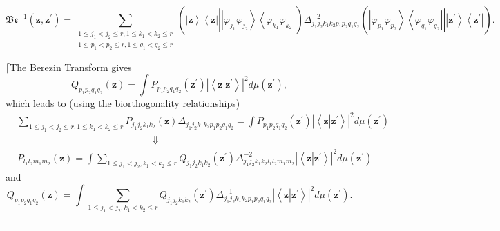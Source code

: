 \documentclass[aps,preprint]{revtex4}%
\begin{document}
\begin{equation}
\mathfrak{Be}^{-1}\left(  \mathbf{z,z}^{\prime}\right)  =\sum_{\substack{1\leq
j_{1}<j_{2}\leq r,1\leq k_{1}<k_{2}\leq r\\1\leq p_{1}<p_{2}\leq r,1\leq
q_{1}<q_{2}\leq r}}\left(  \left\vert \mathbf{z}\right\rangle \left\langle
\mathbf{z}\right\vert \left\vert \overset{}{\left\vert \varphi_{j_{1}}%
\varphi_{j_{2}}\right\rangle \left\langle \varphi_{k_{1}}\varphi_{k_{2}%
}\right\vert }\right.  \right)  \Delta_{j_{1}j_{2}k_{1}k_{2}p_{1}p_{2}%
q_{1}q_{2}}^{-2}\left(  \left.  \overset{}{\left\vert \varphi_{p_{1}}%
\varphi_{p_{2}}\right\rangle \left\langle \varphi_{q_{1}}\varphi_{q_{2}%
}\right\vert }\right\vert \left\vert \mathbf{z}^{\prime}\right\rangle
\left\langle \mathbf{z}^{\prime}\right\vert \right)  .
\end{equation}


$\lceil$The Berezin Transform gives
\begin{equation}
Q_{p_{1}p_{2}q_{1}q_{2}}\left(  \mathbf{z}\right)  =\int P_{p_{1}p_{2}%
q_{1}q_{2}}\left(  \mathbf{z}^{\prime}\right)  \left\vert \left\langle
\mathbf{z}\left\vert \mathbf{z}^{\prime}\right.  \right\rangle \right\vert
^{2}d\mu\left(  \mathbf{z}^{\prime}\right)  ,
\end{equation}
which leads to (using the biorthogonality relationships)
\begin{align}
&  \sum_{1\leq j_{1}<j_{2}\leq r,1\leq k_{1}<k_{2}\leq r}P_{j_{1}j_{2}%
k_{1}k_{2}}\left(  \mathbf{z}\right)  \Delta_{j_{1}j_{2}k_{1}k_{2}p_{1}%
p_{2}q_{1}q_{2}}=\int P_{p_{1}p_{2}q_{1}q_{2}}\left(  \mathbf{z}^{\prime
}\right)  \left\vert \left\langle \mathbf{z}\left\vert \mathbf{z}^{\prime
}\right.  \right\rangle \right\vert ^{2}d\mu\left(  \mathbf{z}^{\prime}\right)
\nonumber\\
&  \qquad\qquad\qquad\qquad\qquad\qquad\qquad\left.  \Downarrow\right.
\nonumber\\
&  P_{l_{1}l_{2}m_{1}m_{2}}\left(  \mathbf{z}\right)  =\int\sum_{1\leq
j_{1}<j_{2},k_{1}<k_{2}\leq r}Q_{j_{1}j_{2}k_{1}k_{2}}\left(  \mathbf{z}%
^{\prime}\right)  \Delta_{j_{1}j_{2}k_{1}k_{2}l_{1}l_{2}m_{1}m_{2}}%
^{-2}\left\vert \left\langle \mathbf{z}\left\vert \mathbf{z}^{\prime}\right.
\right\rangle \right\vert ^{2}d\mu\left(  \mathbf{z}^{\prime}\right)
\end{align}
and
\begin{equation}
Q_{p_{1}p_{2}q_{1}q_{2}}\left(  \mathbf{z}\right)  =\int\sum_{1\leq
j_{1}<j_{2},k_{1}<k_{2}\leq r}Q_{j_{1}j_{2}k_{1}k_{2}}\left(  \mathbf{z}%
^{\prime}\right)  \Delta_{j_{1}j_{2}k_{1}k_{2}p_{1}p_{2}q_{1}q_{2}}%
^{-1}\left\vert \left\langle \mathbf{z}\left\vert \mathbf{z}^{\prime}\right.
\right\rangle \right\vert ^{2}d\mu\left(  \mathbf{z}^{\prime}\right)  .
\end{equation}
$\rfloor$
\end{document}
